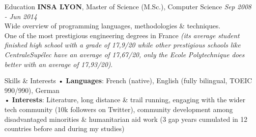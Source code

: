 \documentclass{resume} %
\begin{document}

\begin{rSection}{Education}
{\bf INSA LYON}, Master of Science (M.Sc.), Computer Science \hfill {\em Sep 2008 - Jun 2014} 
\\ Wide overview of programming languages, methodologies \& techniques.
\\ One of the most prestigious engineering degrees in France {\em (its average student finished high school with a grade of 17,9/20 while other prestigious schools like CentraleSupélec have an average of 17,67/20, only the Ecole Polytechnique does better with an average of 17,93/20)}.
\\

\end{rSection}

\begin{rSection}{Skills \& Interests}
• {\bf Languages}: French (native), English (fully bilingual, TOEIC 990/990), German\\
• {\bf Interests}: Literature, long distance \& trail running, engaging with the wider tech community (10k followers on Twitter), community development among disadvantaged minorities \& humanitarian aid work (3 gap years cumulated in 12 countries before and during my studies)
\end{rSection}
\end{document}
